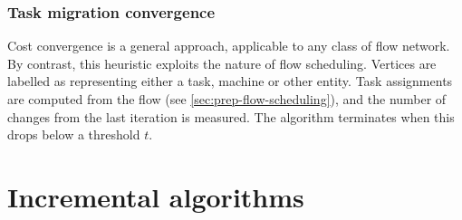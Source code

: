 \subsubsection{Task migration convergence}

Cost convergence is a general approach, applicable to any class of flow network. By contrast, this heuristic exploits the nature of flow scheduling. Vertices are labelled as representing either a task, machine or other entity. Task assignments are computed from the flow (see \cref{sec:prep-flow-scheduling}), and the number of changes from the last iteration is measured. The algorithm terminates when this drops below a threshold $t$.


\section{Incremental algorithms} \label{sec:impl-incremental}

